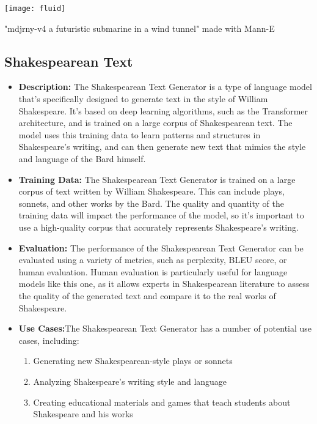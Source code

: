 \begin{pdf}
\begin{marginfigure}[-5.5cm]
        \texttt{[image: fluid]}
        \caption{"mdjrny-v4 a futuristic submarine in a wind tunnel" made with Mann-E}
\end{marginfigure}
\end{pdf}

\subsection{Shakespearean Text} 

\begin{itemize}
\item \textbf{Description:} The Shakespearean Text Generator is a type of language model that's specifically designed to generate text in the style of William Shakespeare. It's based on deep learning algorithms, such as the Transformer architecture, and is trained on a large corpus of Shakespearean text. The model uses this training data to learn patterns and structures in Shakespeare's writing, and can then generate new text that mimics the style and language of the Bard himself.
\item \textbf{Training Data:} The Shakespearean Text Generator is trained on a large corpus of text written by William Shakespeare. This can include plays, sonnets, and other works by the Bard. The quality and quantity of the training data will impact the performance of the model, so it's important to use a high-quality corpus that accurately represents Shakespeare's writing.
\item \textbf{Evaluation:} The performance of the Shakespearean Text Generator can be evaluated using a variety of metrics, such as perplexity, BLEU score, or human evaluation. Human evaluation is particularly useful for language models like this one, as it allows experts in Shakespearean literature to assess the quality of the generated text and compare it to the real works of Shakespeare.
\item \textbf{Use Cases:}The Shakespearean Text Generator has a number of potential use cases, including:
    \begin{enumerate}
        \item Generating new Shakespearean-style plays or sonnets
        \item Analyzing Shakespeare's writing style and language
        \item Creating educational materials and games that teach students about Shakespeare and his works

\end{enumerate}
\end{itemize}
